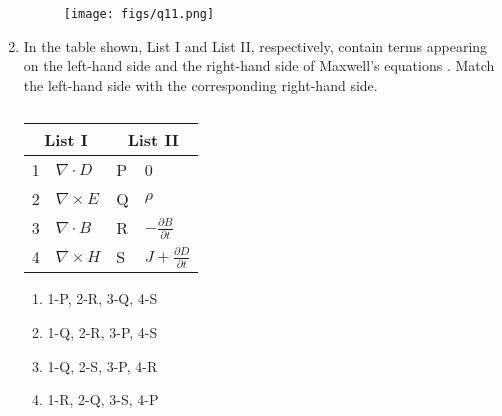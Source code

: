 \documentclass[a4paper, 11pt]{article}
\begin{document}
\begin{enumerate}
    \begin{figure}[H]
        \centering
        \texttt{[image: figs/q11.png]}
        \caption*{}
        \label{fig:q11}
    \end{figure}
    
    \begin{enumerate}
    \end{enumerate}

    \hfill{}
    
    \item In the table shown, List I and List II, respectively, contain terms appearing on the left-hand side and the right-hand side of Maxwell's equations . Match the left-hand side with the corresponding right-hand side.
    
    \begin{table}[H]
    \centering
    \begin{tabular}{|l|l|l|l|}
        \hline
        \multicolumn{2}{|c|}{\textbf{List I}} & \multicolumn{2}{c|}{\textbf{List II}} \\
        \hline
        1 & $\nabla \cdot D$ & P & 0 \\
        \hline
        2 & $\nabla \times E$ & Q & $\rho$ \\
        \hline
        3 & $\nabla \cdot B$ & R & $-\frac{\partial B}{\partial t}$ \\
        \hline
        4 & $\nabla \times H$ & S & $J + \frac{\partial D}{\partial t}$ \\
        \hline
    \end{tabular}
    \caption*{}
    \label{tab:q12}
    \end{table}

    \begin{enumerate}
        \item 1-P, 2-R, 3-Q, 4-S
        \item 1-Q, 2-R, 3-P, 4-S
        \item 1-Q, 2-S, 3-P, 4-R
        \item 1-R, 2-Q, 3-S, 4-P
    \end{enumerate}
    

\end{enumerate}
\end{document}
